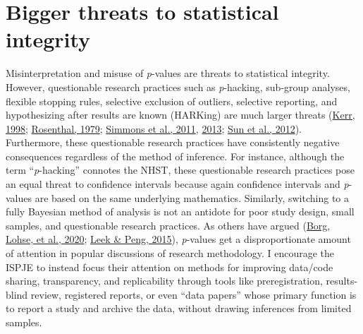 \documentclass[]{cik}%
\begin{document}
\hypertarget{bigger-threats-to-statistical-integrity}{%
\section{Bigger threats to statistical
integrity}\label{bigger-threats-to-statistical-integrity}}

Misinterpretation and misuse of \emph{p}-values are threats to
statistical integrity. However, questionable research practices such as
\emph{p}-hacking, sub-group analyses, flexible stopping rules, selective
exclusion of outliers, selective reporting, and hypothesizing after
results are known (HARKing) are much larger threats
(\protect\hyperlink{ref-37}{Kerr, 1998};
\protect\hyperlink{ref-38}{Rosenthal, 1979};
\protect\hyperlink{ref-35}{Simmons et al., 2011},
\protect\hyperlink{ref-34}{2013}; \protect\hyperlink{ref-36}{Sun et al.,
2012}). Furthermore, these questionable research practices have
consistently negative consequences regardless of the method of
inference. For instance, although the term ``\emph{p}-hacking'' connotes
the NHST, these questionable research practices pose an equal threat to
confidence intervals because again confidence intervals and
\emph{p}-values are based on the same underlying mathematics. Similarly,
switching to a fully Bayesian method of analysis is not an antidote for
poor study design, small samples, and questionable research practices.
As others have argued (\protect\hyperlink{ref-39}{Borg, Lohse, et al.,
2020}; \protect\hyperlink{ref-40}{Leek \& Peng, 2015}), \emph{p}-values
get a disproportionate amount of attention in popular discussions of
research methodology. I encourage the ISPJE to instead focus their
attention on methods for improving data/code sharing, transparency, and
replicability through tools like preregistration, results-blind review,
registered reports, or even ``data papers'' whose primary function is to
report a study and archive the data, without drawing inferences from
limited samples.
\end{document}
